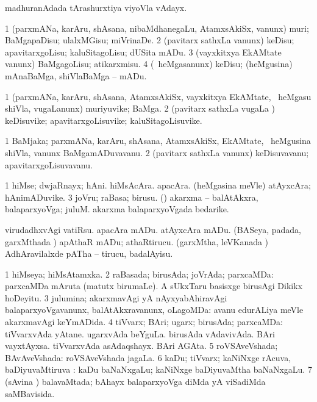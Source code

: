 \bentry
{} 
\gl{\nA}
\expl{}
\bmng
 madhuranAdada tArashurxtiya viyoVla vAdayx. 
\emng
\eentry

\bentry
{} 
\gl{\sakirx}
\expl{}
\bmng
\bnum
\num{1} (parxmANa, karAru, shAsana, nibaMdhanegaLu, AtamxsAkiSx, \mo vanunx) muri; BaMgapaDisu; ulalxMGisu; miVrinaDe. 
\num{2} (pavitarx sathxLa \mo vanunx) keDisu; apavitarxgoLisu; kaluSitagoLisu; dUSita mADu. 
\num{3} (vayxkitxya EkAMtate \mo vanunx) BaMgagoLisu; atikarxmisu. 
\num{4} (\sA\ heMgasanunx) keDisu; (heMgusina) mAnaBaMga, shiVlaBaMga -- mADu. 
\enum
\emng
\eentry

\bentry
{} 
\gl{\nA}
\expl{}
\bmng
\bnum
\num{1} (parxmANa, karAru, shAsana, AtamxsAkiSx, vayxkitxya EkAMtate, \sA\ heMgasu shiVla, \mo vugaLanunx) muriyuvike; BaMga. 
\num{2} (pavitarx sathxLa \mo vugaLa \vi) keDisuvike; apavitarxgoLisuvike; kaluSitagoLisuvike. 
\enum
\emng
\eentry

\bentry
{} 
\gl{\nA}
\expl{}
\bmng
\bnum
\num{1} BaMjaka; parxmANa, karAru, shAsana, AtamxsAkiSx, EkAMtate, \sA\ heMgusina shiVla, \mo vanunx BaMgamADuvavanu. 
\num{2} (pavitarx sathxLa \mo vanunx) keDisuvavanu; apavitarxgoLisuvavanu. 
\enum
\emng
\eentry

\bentry
{} 
\gl{\nA}
\expl{}
\bmng
\bnum
\num{1} hiMse; dwjaRnayx; hAni. 
\banum
{} hiMsAcAra. 
 apacAra. 
 (heMgasina meVle) atAyxcAra; hAnimADuvike. 
\eanum
\numie
\num{3} joVru; raBasa; birusu. 
 (\nAyxshA) 
\banum
{} akarxma -- balAtAkxra, balaparxyoVga; juluM. 
 akarxma balaparxyoVgada bedarike. 
\eanum
\numie
\enum
\emng

\noindent
\gl{\pagu}
\expl{}
\bmng
\banum
{} virudadhxvAgi vatiRsu. 
 apacAra mADu. 
 atAyxcAra mADu. 
 (BASeya, padada, garxMthada \vi) apAthaR mADu; athaRtirucu. 
 (garxMtha, leVKanada \vi) AdhAravilalxde pATha -- tirucu, badalAyisu. 
\eanum
\emng
\eentry

\bentry
{} 
\gl{\gu}
\expl{}
\bmng
\bnum
\num{1} hiMseya; hiMsAtamxka. 
\num{2} raBasada; birusAda; joVrAda; parxcaMDa:  parxcaMDa mAruta (matutx birumaLe).  A sUkxTaru basisxge birusAgi Dikikx hoDeyitu. 
\num{3} julumina; akarxmavAgi yA nAyxyabAhiravAgi balaparxyoVgavanunx, balAtAkxravanunx, oLagoMDa:  avanu edurALiya meVle akarxmavAgi keYmADida. 
\num{4} tiVvarx; BAri; ugarx; birusAda; parxcaMDa:  tiVvarxvAda yAtane.  ugarxvAda beYguLa.  birusAda vAdavivAda.  BAri vayxtAyxsa.  tiVvarxvAda asAdaqshayx.  BAri AGAta. 
\num{5} roVSAveVshada; BAvAveVshada:  roVSAveVshada jagaLa. 
\num{6} kaDu; tiVvarx; kaNiNxge rAcuva, baDiyuvaMtiruva :  kaDu baNaNxgaLu; kaNiNxge baDiyuvaMtha baNaNxgaLu. 
\num{7} (sAvina \vi) balavaMtada; bAhayx balaparxyoVga diMda yA viSadiMda saMBavisida. 
\enum
\emng
\eentry

